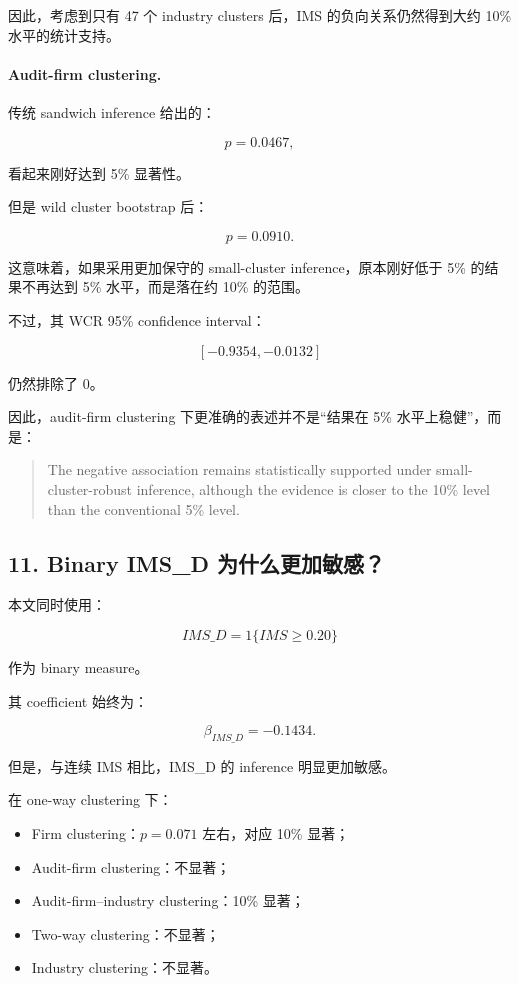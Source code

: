\documentclass[11pt]{article}
\begin{document}
因此，考虑到只有 47 个 industry clusters 后，IMS 的负向关系仍然得到大约 10\% 水平的统计支持。

\paragraph{Audit-firm clustering.}

传统 sandwich inference 给出的：

\[
p=0.0467,
\]

看起来刚好达到 5\% 显著性。

但是 wild cluster bootstrap 后：

\[
p=0.0910.
\]

这意味着，如果采用更加保守的 small-cluster inference，原本刚好低于 5\% 的结果不再达到 5\% 水平，而是落在约 10\% 的范围。

不过，其 WCR 95\% confidence interval：

\[
[-0.9354,-0.0132]
\]

仍然排除了 0。

因此，audit-firm clustering 下更准确的表述并不是“结果在 5\% 水平上稳健”，而是：

\begin{quote}
The negative association remains statistically supported under small-cluster-robust inference, although the evidence is closer to the 10\% level than the conventional 5\% level.
\end{quote}

\subsection{11. Binary IMS\_D 为什么更加敏感？}

本文同时使用：

\[
IMS\_D=1\{IMS\geq0.20\}
\]

作为 binary measure。

其 coefficient 始终为：

\[
\beta_{IMS\_D}=-0.1434.
\]

但是，与连续 IMS 相比，IMS\_D 的 inference 明显更加敏感。

在 one-way clustering 下：

\begin{itemize}
    \item Firm clustering：$p=0.071$ 左右，对应 10\% 显著；
    \item Audit-firm clustering：不显著；
    \item Audit-firm--industry clustering：10\% 显著；
    \item Two-way clustering：不显著；
    \item Industry clustering：不显著。
\end{itemize}
\end{document}
